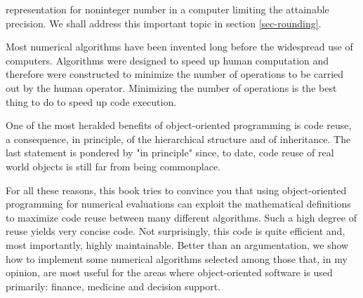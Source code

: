 \documentclass[twoside]{book}
\begin{document}
representation for noninteger number in a computer limiting the
attainable precision. We shall address this important topic in
section \ref{sec-rounding}.
\par
Most numerical algorithms have been invented long before the widespread use of computers. Algorithms were designed to speed up
human computation and therefore were constructed to minimize
the number of operations to be carried out by the human operator.
Minimizing the number of operations is the best thing to do to
speed up code execution.
\par
One of the most heralded benefits of object-oriented programming
is code reuse, a consequence, in principle, of the hierarchical
structure and of inheritance. The last statement is pondered by
"in principle" since, to date, code reuse of real world objects is
still far from being commonplace.
\par
For all these reasons, this book tries to convince you that using
object-oriented programming for numerical evaluations can exploit
the mathematical definitions to maximize code reuse between many
different algorithms. Such a high degree of reuse yields very
concise code. Not surprisingly, this code is quite efficient and,
most importantly, highly maintainable. Better than an
argumentation, we show how to implement some numerical algorithms
selected among those that, in my opinion, are most useful for the areas
where object-oriented software is used primarily: finance,
medicine and decision support.
\end{document}
